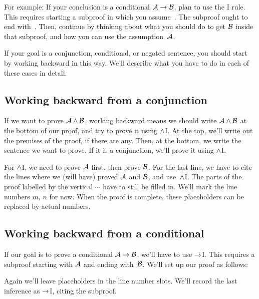 For example: If your conclusion is a conditional $\mathcal{A}\rightarrow\mathcal{B}$, plan to use the {\eif}I rule. This requires starting a subproof in which you assume~. The subproof ought to end with~. Then, continue by thinking about what you should do to get $\mathcal{B}$ inside that subproof, and how you can use the assumption~$\mathcal{A}$.

If your goal is a conjunction, conditional, or negated sentence, you should start by working backward in this way. We'll describe what you have to do in each of these cases in detail.

\subsection*{Working backward from a conjunction}

If we want to prove $\mathcal{A} \wedge \mathcal{B}$, working backward means we should write $\mathcal{A} \wedge \mathcal{B}$ at the bottom of our proof, and try to prove it using $\wedge$I. At the top, we'll write out the premises of the proof, if there are any. Then, at the bottom, we write the sentence we want to prove. If it is a conjunction, we'll prove it using $\wedge$I.
  \begin{fitchproof}
	\ellipsesline 
\ellipsesline
    \ellipsesline 
  \end{fitchproof}
For $\wedge$I, we need to prove $\mathcal{A}$ first, then prove
$\mathcal{B}$. For the last line, we have to cite the lines where we
(will have) proved $\mathcal{A}$ and  $\mathcal{B}$, and use~$\wedge$I. The
parts of the proof labelled by the vertical $\cdots$ have to still be filled in.
We'll mark the line numbers $m$, $n$ for now. When the proof is
complete, these placeholders can be replaced by actual numbers.

\subsection*{Working backward from a conditional}

If our goal is to prove a conditional $\mathcal{A} \rightarrow \mathcal{B}$, we'll have to use $\rightarrow$I. This requires a subproof starting with $\mathcal{A}$ and ending with~$\mathcal{B}$. We'll set up our proof as follows:
\begin{fitchproof}
\open
{}
\ellipsesline 
{}
\close
{}
\end{fitchproof} 
Again we'll leave placeholders in the line number slots. We'll record the last inference as $\rightarrow$I, citing the subproof.

